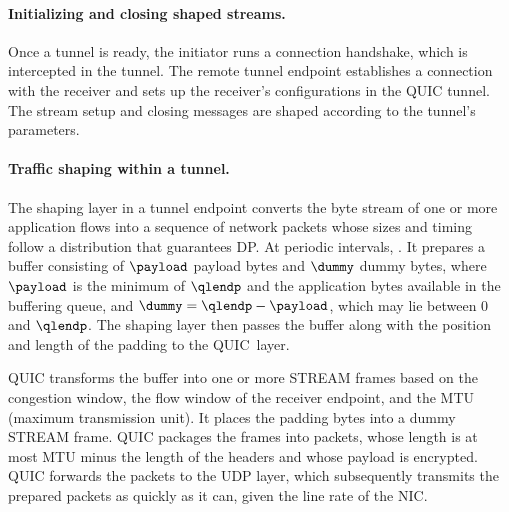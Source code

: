 {\paragraph{Initializing and closing shaped streams.}
Once a tunnel is ready, the initiator runs a connection handshake, which is
intercepted in the tunnel.
The remote tunnel endpoint establishes a connection with the receiver and sets
up the receiver's configurations in the QUIC tunnel.
The stream setup and closing messages are shaped according to the tunnel's
parameters. 


\paragraph{Traffic shaping within a tunnel.}
The shaping layer in a tunnel endpoint converts the byte stream of one or more
application flows into a sequence of network packets whose sizes and timing
follow a distribution that guarantees DP.
At periodic intervals, . It prepares a buffer consisting of $\payload$ payload bytes
and $\dummy$ dummy bytes, where $\payload$ is the minimum of $\qlendp$ and the
application bytes available in the buffering queue, and $\dummy = \qlendp -
\payload$, which may lie between 0 and $\qlendp$. The shaping layer then passes
the buffer along with the position and length of the padding to the QUIC~layer.

QUIC transforms the buffer into one or more STREAM frames based on the
congestion window, the flow window of the receiver endpoint, and the MTU
(maximum transmission unit). It
places the padding bytes into a dummy STREAM frame. QUIC packages the frames
into packets, whose length is at most MTU
minus the length of the headers and whose payload is
encrypted. QUIC forwards the packets to the UDP layer, which subsequently
transmits the prepared packets as quickly as it can, given the line rate of the
NIC.

}
